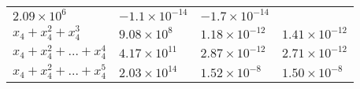 \documentclass[
]{article}
\begin{document}
\begin{longtable}[]{@{}llll@{}}
\begin{minipage}[t]{0.15\columnwidth}
\(2.09 \times 10^{6}\)\strut
\end{minipage} & \begin{minipage}[t]{0.36\columnwidth}\raggedright
\(-1.1 \times 10^{-14}\)\strut
\end{minipage} & \begin{minipage}[t]{0.15\columnwidth}\raggedright
\(-1.7 \times 10^{-14}\)\strut
\end{minipage}\tabularnewline
\begin{minipage}[t]{0.23\columnwidth}\raggedright
\(x_{4}+x_{4}^{2}+x_{4}^{3}\)\strut
\end{minipage} & \begin{minipage}[t]{0.15\columnwidth}\raggedright
\(9.08 \times 10^{8}\)\strut
\end{minipage} & \begin{minipage}[t]{0.36\columnwidth}\raggedright
\(1.18 \times 10^{-12}\)\strut
\end{minipage} & \begin{minipage}[t]{0.15\columnwidth}\raggedright
\(1.41 \times 10^{-12}\)\strut
\end{minipage}\tabularnewline
\begin{minipage}[t]{0.23\columnwidth}\raggedright
\(x_{4}+x_{4}^{2}+\dots+x_{4}^{4}\)\strut
\end{minipage} & \begin{minipage}[t]{0.15\columnwidth}\raggedright
\(4.17 \times 10^{11}\)\strut
\end{minipage} & \begin{minipage}[t]{0.36\columnwidth}\raggedright
\(2.87 \times 10^{-12}\)\strut
\end{minipage} & \begin{minipage}[t]{0.15\columnwidth}\raggedright
\(2.71 \times 10^{-12}\)\strut
\end{minipage}\tabularnewline
\begin{minipage}[t]{0.23\columnwidth}\raggedright
\(x_{4}+x_{4}^{2}+\dots+x_{4}^{5}\)\strut
\end{minipage} & \begin{minipage}[t]{0.15\columnwidth}\raggedright
\(2.03 \times 10^{14}\)\strut
\end{minipage} & \begin{minipage}[t]{0.36\columnwidth}\raggedright
\(1.52 \times 10^{-8}\)\strut
\end{minipage} & \begin{minipage}[t]{0.15\columnwidth}\raggedright
\(1.50 \times 10^{-8}\)\strut
\end{minipage}\tabularnewline

\end{longtable}
\end{document}
